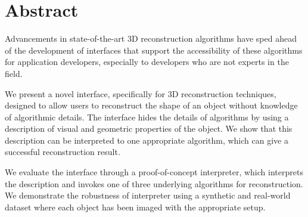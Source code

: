 
\chapter{Abstract}

Advancements in state-of-the-art 3D reconstruction algorithms have sped ahead of the development of interfaces that support the accessibility of these algorithms for application developers, especially to developers who are not experts in the field. 

We present a novel interface, specifically for 3D reconstruction techniques, designed to allow users to reconstruct the shape of an object without knowledge of algorithmic details. The interface hides the details of algorithms by using a description of visual and geometric properties of the object. We show that this description can be interpreted to one appropriate algorithm, which can give a successful reconstruction result. 

We evaluate the interface through a proof-of-concept interpreter, which interprets the description and invokes one of three underlying algorithms for reconstruction. We demonstrate the robustness of interpreter using a synthetic and real-world dataset where each object has been imaged with the appropriate setup.
